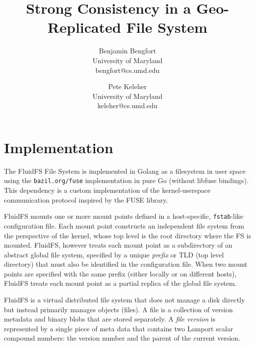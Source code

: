 \documentclass[letterpaper,twocolumn,10pt]{article}
\begin{document}
\date{}

\title{\Large \bf Strong Consistency in a Geo-Replicated File System}

\author{
{\rm Benjamin Bengfort}\\
University of Maryland\\
bengfort@cs.umd.edu
\and
{\rm Pete Keleher}\\
University of Maryland\\
keleher@cs.umd.edu
} %

\maketitle




\section*{Implementation}

The FluidFS File System is implemented in Golang as a filesystem in user
space using the \texttt{bazil.org/fuse} implementation in pure Go
(without libfuse bindings).
This dependency is a custom implementation of the kernel-userspace
communication protocol inspired by the FUSE library.

FluidFS mounts one or more mount points defined in a host-specific,
\texttt{fstab}-like configuration file.
Each mount point constructs an independent file system from the perspective
of the kernel, whose top level is the root directory where the FS is mounted.
FluidFS, however treats each mount point as a subdirectory of an abstract
global file system, specified by a unique \textit{prefix} or TLD (top level
directory) that must also be identified in the configuration file.
When two mount points are specified with the same prefix (either locally or
on different hosts), FluidFS treats each mount point as a partial replica of
the global file system.

FluidFS is a virtual distributed file system that does not manage a disk
directly but instead primarily manages objects (files).
A file is a collection of version metadata and binary blobs that are stored
separately. A \textit{file version} is represented by a single piece of meta
data that contains two Lamport scalar compound numbers: the version number and the parent of the current version.


{\footnotesize 
}
\end{document}
